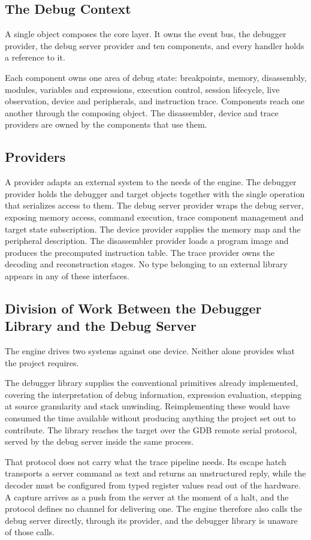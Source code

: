 \subsection{The Debug Context}
A single object composes the core layer. It owns the event bus, the debugger provider, the debug server provider and ten components, and every handler holds a reference to it.

Each component owns one area of debug state: breakpoints, memory, disassembly, modules, variables and expressions, execution control, session lifecycle, live observation, device and peripherals, and instruction trace. Components reach one another through the composing object. The disassembler, device and trace providers are owned by the components that use them.

\subsection{Providers}
A provider adapts an external system to the needs of the engine. The debugger provider holds the debugger and target objects together with the single operation that serializes access to them. The debug server provider wraps the debug server, exposing memory access, command execution, trace component management and target state subscription. The device provider supplies the memory map and the peripheral description. The disassembler provider loads a program image and produces the precomputed instruction table. The trace provider owns the decoding and reconstruction stages. No type belonging to an external library appears in any of these interfaces.

\subsection{Division of Work Between the Debugger Library and the Debug Server}
\label{subsec:division}
The engine drives two systems against one device. Neither alone provides what the project requires.

The debugger library supplies the conventional primitives already implemented, covering the interpretation of debug information, expression evaluation, stepping at source granularity and stack unwinding. Reimplementing these would have consumed the time available without producing anything the project set out to contribute. The library reaches the target over the GDB remote serial protocol, served by the debug server inside the same process.

That protocol does not carry what the trace pipeline needs. Its escape hatch transports a server command as text and returns an unstructured reply, while the decoder must be configured from typed register values read out of the hardware. A capture arrives as a push from the server at the moment of a halt, and the protocol defines no channel for delivering one. The engine therefore also calls the debug server directly, through its provider, and the debugger library is unaware of those calls.

